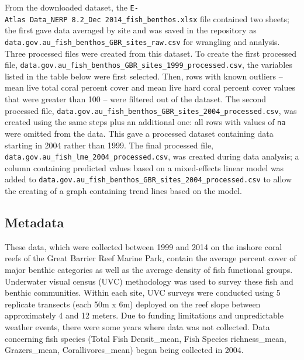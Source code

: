 \documentclass[12pt,]{article}
\begin{document}
From the downloaded dataset, the
\texttt{E-Atlas\ Data\_NERP\ 8.2\_Dec\ 2014\_fish\_benthos.xlsx} file
contained two sheets; the first gave data averaged by site and was saved
in the repository as
\texttt{data.gov.au\_fish\_benthos\_GBR\_sites\_raw.csv} for wrangling
and analysis. Three processed files were created from this dataset. To
create the first processed file,
\texttt{data.gov.au\_fish\_benthos\_GBR\_sites\_1999\_processed.csv},
the variables listed in the table below were first selected. Then, rows
with known outliers -- mean live total coral percent cover and mean live
hard coral percent cover values that were greater than 100 -- were
filtered out of the dataset. The second processed file,
\texttt{data.gov.au\_fish\_benthos\_GBR\_sites\_2004\_processed.csv},
was created using the same steps plus an additional one: all rows with
values of \texttt{na} were omitted from the data. This gave a processed
dataset containing data starting in 2004 rather than 1999. The final
processed file, \texttt{data.gov.au\_fish\_lme\_2004\_processed.csv},
was created during data analysis; a column containing predicted values
based on a mixed-effects linear model was added to
\texttt{data.gov.au\_fish\_benthos\_GBR\_sites\_2004\_processed.csv} to
allow the creating of a graph containing trend lines based on the model.

\hypertarget{metadata}{%
\subsection{Metadata}\label{metadata}}

These data, which were collected between 1999 and 2014 on the inshore
coral reefs of the Great Barrier Reef Marine Park, contain the average
percent cover of major benthic categories as well as the average density
of fish functional groups. Underwater visual census (UVC) methodology
was used to survey these fish and benthic communities. Within each site,
UVC surveys were conducted using 5 replicate transects (each 50m x 6m)
deployed on the reef slope between approximately 4 and 12 meters. Due to
funding limitations and unpredictable weather events, there were some
years where data was not collected. Data concerning fish species (Total
Fish Densit\_mean, Fish Species richness\_mean, Grazers\_mean,
Corallivores\_mean) began being collected in 2004.
\end{document}
